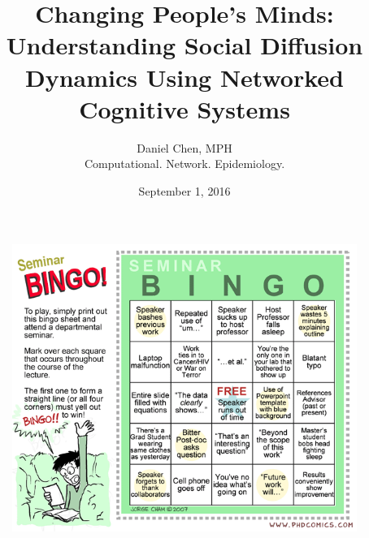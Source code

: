 \documentclass[compress]{beamer}
\title[SDAL]{\vspace{-0.85in}Changing People's Minds: Understanding Social Diffusion Dynamics Using Networked Cognitive Systems}
\author{Daniel Chen, MPH\\ \tiny{Computational. Network. Epidemiology.}}
\date[]{September 1, 2016}
\begin{document}
    \begin{frame}[BlankLogo] \frametitle{}
        \begin{figure}
    \centering
    \includegraphics[height=0.9\textheight]{../phd040907s_bingo}
    \label{fig:phd040907sbingo}
    \end{figure}

    \end{frame}

    \begin{frame}[Title]
        \titlepage
    \end{frame}



\end{document}
